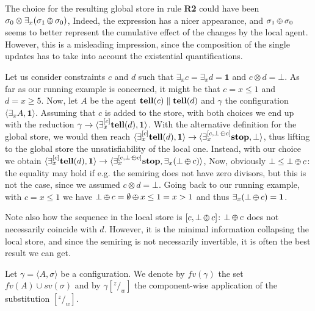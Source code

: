\documentclass{llncs}
\newcommand{\tell}{{\bf tell}}
\newcommand{\ostop}{{\bf stop}}
\def\monid{{\mathbf 0}}
\def\odiv{\, {\ominus\hspace{-7.7pt} \div} \,}
\def\monid{\mathbf{1}}
\begin{document}


\begin{remark}
The choice for the resulting global store in rule {\bf R2} could have been 
$\sigma_0 \otimes \exists_x(\sigma_1 \odiv \sigma _0)$, 
Indeed, the expression has a nicer appearance,
and $\sigma_1 \odiv \sigma_0$ seems to better represent the cumulative effect of the
changes by the local agent.
However, this is a misleading impression, since the composition of the single updates
has to take into account the existential quantifications.


Let us consider constraints $c$ and $d$ such that $\exists_x c = \exists_x d = \monid$ and $c \otimes d = \bot$.
As far as our running example is concerned, it might be that $c = x \leq 1$ and $d = x \geq 5$. 
Now, let $A$ be the agent $\hbox{\tell}(c) \parallel \hbox{\tell}(d)$ and $\gamma$ the configuration 
$\langle \exists_x A, \monid \rangle$.
Assuming that $c$ is added to the store, with both choices we end up with the reduction
$\gamma \to \langle \exists_x^{[ c ]} \hbox{\tell}(d), \monid \rangle$.
With the alternative definition for the global store, we would then reach 
 $\langle \exists_x^{[c]} \hbox{\tell}(d), \monid \rangle \to \langle \exists_x^{[c,\bot \odiv c]} \hbox{\ostop}, \bot \rangle$,
 thus lifting to the global store the unsatisfiability of the local one.
 Instead, with our choice we obtain 
 $\langle \exists_x^{[c]} \hbox{\tell}(d), \monid \rangle \to \langle \exists_x^{[c,\bot \odiv c]} \hbox{\ostop}, \exists_x (\bot \odiv c) \rangle$, 
Now, obviously $\bot \leq \bot \odiv c$: the equality may hold if e.g. the semiring does not have zero divisors, 
but this is not the case, since we assumed $c \otimes d = \bot$.
Going back to our running example, with $c = x \leq 1$ we have $\bot \odiv c = \emptyset \odiv x \leq 1 = x > 1$
and thus $\exists_x (\bot \odiv c) = \monid$.

Note also how the sequence in the local store is $[c,\bot \odiv c]$: $\bot \odiv c$ does not necessarily coincide with $d$.
However, it is the minimal information collapsing the local store, and since the semiring is not 
necessarily invertible, it is often the best result we can get.
\end{remark}

Let $\gamma = \langle A, \sigma \rangle$ be a configuration.
%
We denote by $fv(\gamma)$ the set $fv(A) \cup sv(\sigma)$ and by
$\gamma[^z/_w]$ the component-wise application of the substitution $[^z/_w]$.
\end{document}
